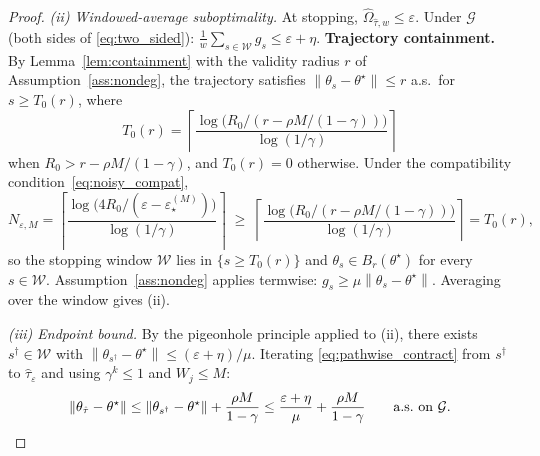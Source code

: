 \documentclass[10pt,a4paper]{amsart}
\newcommand{\Ogap}{\Omega}
\newcommand{\norm}[1]{\left\lVert#1\right\rVert}
\begin{document}
\begin{proof}
\emph{(ii) Windowed-average suboptimality.}
At stopping, $\widehat{\Ogap}_{\hat\tau, w} \leq \varepsilon$. Under $\mathcal{G}$
(both sides of \eqref{eq:two_sided}):
$\frac{1}{w}\sum_{s \in \mathcal{W}} g_s \leq \varepsilon + \eta$.
\textbf{Trajectory containment.}
By Lemma~\ref{lem:containment} with the validity radius $r$ of
Assumption~\ref{ass:nondeg}, the trajectory satisfies $\norm{\theta_s -
\theta^\star} \leq r$ a.s.\ for $s \geq T_0(r)$, where
\[
  T_0(r) =
  \left\lceil
  \frac{\log\bigl(R_0/(r - \rho M/(1-\gamma))\bigr)}{\log(1/\gamma)}
  \right\rceil
\]
when $R_0 > r - \rho M/(1-\gamma)$, and $T_0(r) = 0$ otherwise. Under the
compatibility condition~\eqref{eq:noisy_compat},
\[
  N_{\varepsilon, M}
  = \left\lceil
    \frac{\log\!\bigl(4R_0/(\varepsilon - \varepsilon_\star^{(M)})\bigr)}
         {\log(1/\gamma)}
    \right\rceil
  \;\geq\;
  \left\lceil
    \frac{\log\bigl(R_0/(r - \rho M/(1-\gamma))\bigr)}{\log(1/\gamma)}
  \right\rceil
  = T_0(r),
\]
so the stopping window $\mathcal{W}$ lies in $\{s \geq T_0(r)\}$ and
$\theta_s \in B_r(\theta^\star)$ for every $s \in \mathcal{W}$.
Assumption~\ref{ass:nondeg} applies termwise:
$g_s \geq \mu\norm{\theta_s - \theta^\star}$. Averaging over the window
gives (ii).

\emph{(iii) Endpoint bound.}
By the pigeonhole principle applied to (ii), there exists
$s^\dagger \in \mathcal{W}$ with
$\norm{\theta_{s^\dagger} - \theta^\star} \leq (\varepsilon + \eta)/\mu$.
Iterating \eqref{eq:pathwise_contract} from $s^\dagger$ to $\hat\tau_\varepsilon$
and using $\gamma^k \leq 1$ and $W_j \leq M$:
\[
  \norm{\theta_{\hat\tau} - \theta^\star}
  \leq \norm{\theta_{s^\dagger} - \theta^\star} + \frac{\rho M}{1 - \gamma}
  \leq \frac{\varepsilon + \eta}{\mu} + \frac{\rho M}{1 - \gamma}
  \qquad \text{a.s.\ on } \mathcal{G}. \qedhere
\]
\end{proof}
\end{document}
